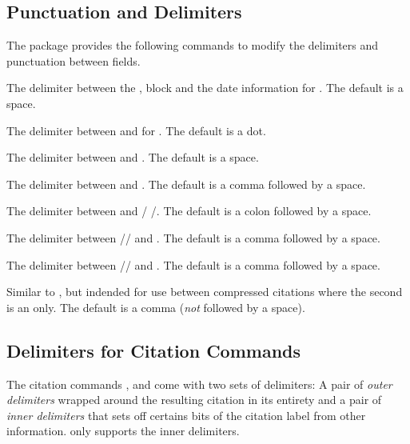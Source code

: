 \documentclass{ltxdockit}
\begin{document}
\subsection{Punctuation and Delimiters}
The package provides the following commands to modify the delimiters and
punctuation between fields.
\begin{ltxsyntax}
The delimiter between the ,  block and the
date information for .
The default is a space.

The delimiter between  and  for
.
The default is a dot.

The delimiter between  and .
The default is a space.

The delimiter between  and .
The default is a comma followed by a space.

The delimiter between  and /%
/.
The default is a colon followed by a space.

The delimiter between //%
 and .
The default is a comma followed by a space.

The delimiter between //%
 and .
The default is a comma followed by a space.

Similar to , but indended for use between compressed
citations where the second is an  only.
The default is a comma (\emph{not} followed by a space).
\end{ltxsyntax}

\subsection{Delimiters for Citation Commands}
The citation commands ,  and  come with
two sets of delimiters: A pair of \emph{outer delimiters} wrapped around the
resulting citation in its entirety and a pair of \emph{inner delimiters} that
sets off certains bits of the citation label from other information.
 only supports the inner delimiters.
\end{document}
